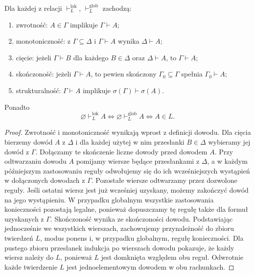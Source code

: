 \begin{stwierdzenie}
\label{prop:ncl-modal-consequence-structural}
Dla każdej z relacji $\vdash_L^{\mathrm{lok}}$,
$\vdash_L^{\mathrm{glob}}$ zachodzą:
\begin{enumerate}
\item zwrotność: $A\in\Gamma$ implikuje
      $\Gamma\vdash A$;
\item monotoniczność: z $\Gamma\subseteq\Delta$
      i $\Gamma\vdash A$ wynika $\Delta\vdash A$;
\item cięcie: jeżeli $\Gamma\vdash B$ dla każdego
      $B\in\Delta$ oraz $\Delta\vdash A$, to
      $\Gamma\vdash A$;
\item skończoność: jeżeli $\Gamma\vdash A$,
      to pewien skończony $\Gamma_0\subseteq\Gamma$
      spełnia $\Gamma_0\vdash A$;
\item strukturalność: $\Gamma\vdash A$ implikuje
      $\sigma(\Gamma)\vdash\sigma(A)$.
\end{enumerate}
Ponadto
\[
 \varnothing\vdash_L^{\mathrm{lok}} A
 \iff \varnothing\vdash_L^{\mathrm{glob}} A
 \iff A\in L.
\]
\end{stwierdzenie}
\begin{proof}
Zwrotność i monotoniczność wynikają wprost
z definicji dowodu. Dla cięcia bierzemy dowód
$A$ z $\Delta$ i dla każdej użytej w nim przesłanki
$B\in\Delta$ wybieramy jej dowód z $\Gamma$.
Dołączamy te skończenie liczne dowody przed
dowodem $A$. Przy odtwarzaniu dowodu $A$
pomijamy wiersze będące przesłankami z $\Delta$,
a w każdym późniejszym zastosowaniu reguły
odwołujemy się do ich wcześniejszych wystąpień
w dołączonych dowodach z $\Gamma$.
Pozostałe wiersze odtwarzamy przez dozwolone reguły.
Jeśli ostatni wiersz jest już wcześniej uzyskany,
możemy zakończyć dowód na jego wystąpieniu.
W przypadku globalnym wszystkie zastosowania
konieczności pozostają legalne, ponieważ
dopuszczamy tę regułę także dla formuł
uzyskanych z $\Gamma$.
Skończoność wynika ze skończoności dowodu.
Podstawiając jednocześnie we wszystkich wierszach,
zachowujemy przynależność do zbioru twierdzeń $L$,
modus ponens i, w przypadku globalnym, regułę
konieczności.
Dla pustego zbioru przesłanek indukcja po
wierszach dowodu pokazuje, że każdy wiersz
należy do $L$, ponieważ $L$ jest domknięta
względem obu reguł. Odwrotnie każde twierdzenie
$L$ jest jednoelementowym dowodem w obu rachunkach.
\end{proof}

